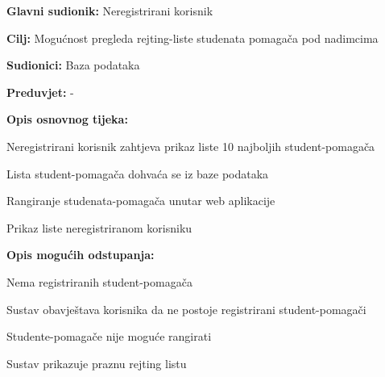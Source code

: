 				
					\noindent {}
					\begin{packed_item}
						
						\item \textbf{Glavni sudionik: }Neregistrirani korisnik
						\item  \textbf{Cilj:} Mogućnost pregleda rejting-liste studenata pomagača pod nadimcima
						\item  \textbf{Sudionici:} Baza podataka
						\item  \textbf{Preduvjet:} -
						\item  \textbf{Opis osnovnog tijeka:}
						
						\item[] \begin{packed_enum}
							\item Neregistrirani korisnik zahtjeva prikaz liste 10 najboljih student-pomagača
							\item Lista student-pomagača dohvaća se iz baze podataka
							\item Rangiranje studenata-pomagača unutar web aplikacije
							\item Prikaz liste neregistriranom korisniku
						\end{packed_enum}
						
						\item  \textbf{Opis mogućih odstupanja:}
						
						\item[] \begin{packed_item}
							
							\item[2.a] Nema registriranih student-pomagača
							\item[] \begin{packed_enum}
								\item Sustav obavještava korisnika da ne postoje registrirani student-pomagači
							\end{packed_enum}
							
							\item[3.a] Studente-pomagače nije moguće rangirati
							\item[] \begin{packed_enum}
								\item Sustav prikazuje praznu rejting listu
							\end{packed_enum}
							
						\end{packed_item}
					\end{packed_item}
				
